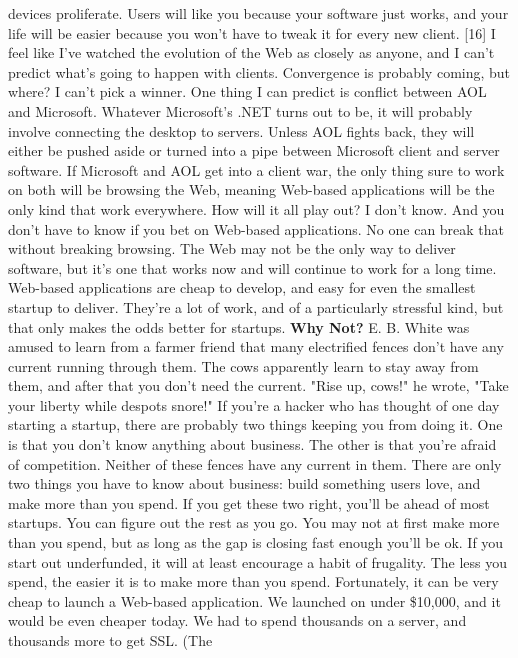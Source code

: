 devices proliferate.  Users will like you because your software
just works, and your life will be easier because you won't have to
tweak it for every new client.   [16]
I feel like I've watched the evolution of the Web as closely as
anyone, and I can't predict what's going to happen with clients.
Convergence is probably coming, but where?  I can't pick a winner.
One thing I can predict is conflict between AOL and Microsoft.
Whatever Microsoft's .NET turns out to be, it will probably involve
connecting the desktop to servers.  Unless AOL fights back, they
will either be pushed aside or turned into a pipe between Microsoft
client and server software.  If Microsoft and AOL get into a client
war, the only thing sure to work on both will be browsing the Web,
meaning Web-based applications will be the only kind that work
everywhere.
How will it all play out?  I don't know.  And you don't have to
know if you bet on Web-based applications.  No one can break that
without breaking browsing.  The Web may not be the only way to
deliver software, but it's one that works now and will continue to
work for a long time.  Web-based applications are cheap to develop,
and easy for even the smallest startup to deliver.  They're a lot
of work, and of a particularly stressful kind, but that only makes
the odds better for startups.
\textbf{Why Not?}
E. B. White was amused to learn from a farmer friend that many
electrified fences don't have any current running through them.
The cows apparently learn to stay away from them, and after that
you don't need the current.  "Rise up, cows!" he wrote, "Take your
liberty while despots snore!"
If you're a hacker who has thought of one day starting a startup,
there are probably two things keeping you from doing it.  One is
that you don't know anything about business.  The other is that
you're afraid of competition.  Neither of these fences have any
current in them.
There are only two things you have to know about business:  build
something users love, and make more than you spend.  If you get
these two right, you'll be ahead of most startups.  You can figure
out the rest as you go.
You may not at first make more than you spend, but as long as the
gap is closing fast enough you'll be ok.  If you start out underfunded,
it will at least encourage a habit of frugality.  The less you
spend, the easier it is to make more than you spend.  Fortunately,
it can be very cheap to launch a Web-based application.  We launched
on under \$10,000, and it would be even cheaper today.  We had to
spend thousands on a server, and thousands more to get SSL.  (The
